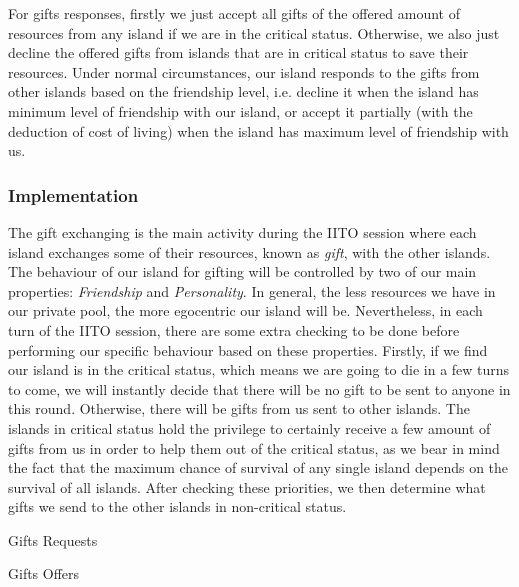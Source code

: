 For gifts responses, firstly we just accept all gifts of the offered amount of resources from any island if we are in the critical status. Otherwise, we also just decline the offered gifts from islands that are in critical status to save their resources. Under normal circumstances, our island responds to the gifts from other islands based on the friendship level, i.e. decline it when the island has minimum level of friendship with our island, or accept it partially (with the deduction of cost of living) when the island has maximum level of friendship with us.

\subsubsection{Implementation} \label{subsubsec:Team6_IITO:Implementation}
The gift exchanging is the main activity during the IITO session where each island exchanges some of their resources, known as \emph{gift}, with the other islands. The behaviour of our island for gifting will be controlled by two of our main properties: \emph{Friendship} and \emph{Personality}. In general, the less resources we have in our private pool, the more egocentric our island will be. Nevertheless, in each turn of the IITO session, there are some extra checking to be done before performing our specific behaviour based on these properties. Firstly, if we find our island is in the critical status, which means we are going to die in a few turns to come, we will instantly decide that there will be no gift to be sent to anyone in this round. Otherwise, there will be gifts from us sent to other islands. The islands in critical status hold the privilege to certainly receive a few amount of gifts from us in order to help them out of the critical status, as we bear in mind the fact that the maximum chance of survival of any single island depends on the survival of all islands. After checking these priorities, we then determine what gifts we send to the other islands in non-critical status.
\begin{algorithm}[H]
\SetAlgoLined
    \caption{Gifts Requests}
\end{algorithm}

\begin{algorithm}[H]
\SetAlgoLined
    \caption{Gifts Offers}
\end{algorithm}


